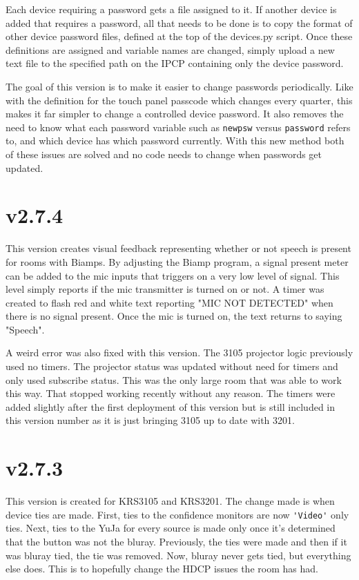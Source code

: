 \documentclass{article}
\begin{document}
Each device requiring a password gets a file assigned to it. If another device is added that requires a password, all that needs to be done is to copy the format of other device password files, defined at the top of the devices.py script. Once these definitions are assigned and variable names are changed, simply upload a new text file to the specified path on the IPCP containing only the device password.  

The goal of this version is to make it easier to change passwords periodically. Like with the definition for the touch panel passcode which changes every quarter, this makes it far simpler to change a controlled device password. It also removes the need to know what each password variable such as \lstinline|newpsw| versus \lstinline|password| refers to, and which device has which password currently. With this new method both of these issues are solved and no code needs to change when passwords get updated. 

\section*{v2.7.4} 

This version creates visual feedback representing whether or not speech is present for rooms with Biamps. By adjusting the Biamp program, a signal present meter can be added to the mic inputs that triggers on a very low level of signal. This level simply reports if the mic transmitter is turned on or not. A timer was created to flash red and white text reporting "MIC NOT DETECTED" when there is no signal present. Once the mic is turned on, the text returns to saying "Speech". 

A weird error was also fixed with this version. The 3105 projector logic previously used no timers. The projector status was updated without need for timers and only used subscribe status. This was the only large room that was able to work this way. That stopped working recently without any reason. The timers were added slightly after the first deployment of this version but is still included in this version number as it is just bringing 3105 up to date with 3201.

\section*{v2.7.3}

This version is created for KRS3105 and KRS3201. The change made is when device ties are made. First, ties to the confidence 
monitors are now \lstinline|'Video'| only ties. Next, ties to the YuJa for every source is made only once it's determined that 
the button was not the bluray. Previously, the ties were made and then if it was bluray tied, the tie was removed. Now, bluray 
never gets tied, but everything else does. This is to hopefully change the HDCP issues the room has had. 
\end{document}
